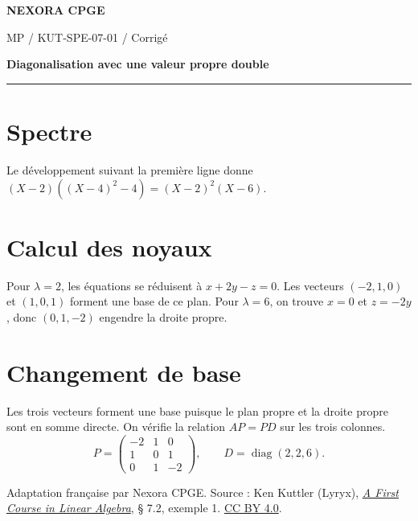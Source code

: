 \documentclass[11pt,a4paper]{article}
\begin{document}
{\small\bfseries\color{nexorablue} NEXORA CPGE}\par
{\small MP / KUT-SPE-07-01 / Corrigé}\par
{\LARGE\bfseries Diagonalisation avec une valeur propre double}\par
\vspace{0.25em}\hrule\vspace{0.6em}

\section*{Spectre}
Le développement suivant la première ligne donne $(X-2)((X-4)^2-4)=(X-2)^2(X-6)$.

\section*{Calcul des noyaux}
Pour $\lambda=2$, les équations se réduisent à $x+2y-z=0$. Les vecteurs $(-2,1,0)$ et $(1,0,1)$ forment une base de ce plan. Pour $\lambda=6$, on trouve $x=0$ et $z=-2y$, donc $(0,1,-2)$ engendre la droite propre.

\section*{Changement de base}
Les trois vecteurs forment une base puisque le plan propre et la droite propre sont en somme directe. On vérifie la relation $AP=PD$ sur les trois colonnes.
\[ P=\begin{pmatrix}-2&1&0\\1&0&1\\0&1&-2\end{pmatrix},\qquad D=\operatorname{diag}(2,2,6). \]

\bigskip
{\footnotesize Adaptation française par Nexora CPGE. Source : Ken Kuttler (Lyryx),
\href{https://math.libretexts.org/Bookshelves/Linear_Algebra/A_First_Course_in_Linear_Algebra_(Kuttler)/07\%253A_Spectral_Theory/7.02\%253A_Diagonalization}{\textit{A First Course in Linear Algebra}}, § 7.2, exemple 1.
\href{https://creativecommons.org/licenses/by/4.0/}{CC BY 4.0}.}
\end{document}
